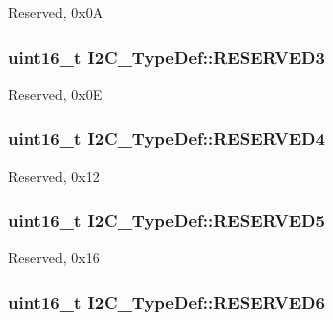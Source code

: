 Reserved, 0x0\-A \hypertarget{struct_i2_c___type_def_a355b2c5aa0dd467de1f9dea4a9afe986}{
\subsubsection[{R\-E\-S\-E\-R\-V\-E\-D3}]{\setlength{\rightskip}{0pt plus 5cm}uint16\-\_\-t I2\-C\-\_\-\-Type\-Def\-::\-R\-E\-S\-E\-R\-V\-E\-D3}}\label{struct_i2_c___type_def_a355b2c5aa0dd467de1f9dea4a9afe986}
Reserved, 0x0\-E \hypertarget{struct_i2_c___type_def_a05a1a3482d9534ba9ef976e3277040f0}{
\subsubsection[{R\-E\-S\-E\-R\-V\-E\-D4}]{\setlength{\rightskip}{0pt plus 5cm}uint16\-\_\-t I2\-C\-\_\-\-Type\-Def\-::\-R\-E\-S\-E\-R\-V\-E\-D4}}\label{struct_i2_c___type_def_a05a1a3482d9534ba9ef976e3277040f0}
Reserved, 0x12 \hypertarget{struct_i2_c___type_def_ae736412dcff4daa38bfa8bf8628df316}{
\subsubsection[{R\-E\-S\-E\-R\-V\-E\-D5}]{\setlength{\rightskip}{0pt plus 5cm}uint16\-\_\-t I2\-C\-\_\-\-Type\-Def\-::\-R\-E\-S\-E\-R\-V\-E\-D5}}\label{struct_i2_c___type_def_ae736412dcff4daa38bfa8bf8628df316}
Reserved, 0x16 \hypertarget{struct_i2_c___type_def_aaf1b319262f53669f49e244d94955a60}{
\subsubsection[{R\-E\-S\-E\-R\-V\-E\-D6}]{\setlength{\rightskip}{0pt plus 5cm}uint16\-\_\-t I2\-C\-\_\-\-Type\-Def\-::\-R\-E\-S\-E\-R\-V\-E\-D6}}\label{struct_i2_c___type_def_aaf1b319262f53669f49e244d94955a60}

